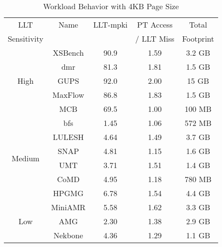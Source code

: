 \begin {table}[b]
\small
\begin{center} 
\vspace{-0.0 in}
\caption{Workload Behavior with 4KB Page Size}
\vspace{-0. in}
\begin{tabular}{| c | c | c | c | c | }
\hline
  LLT                   & Name     &  LLT-mpki  & PT Access    &  Total  \\ 
  Sensitivity           &          &            & / LLT Miss   &  Footprint       \\ \hline
\multirow{5}{*}{High}   & XSBench  & 90.9       & 1.59         &  3.2 GB  \\
                        & dmr      & 81.3       & 1.81         &  1.5 GB  \\
                        & GUPS     & 92.0       & 2.00         &  15  GB  \\
                        & MaxFlow  & 86.8       & 1.83         &  1.5 GB  \\
                        & MCB      & 69.5       & 1.00         &  100 MB  \\ \hline
\multirow{6}{*}{Medium} & bfs      & 1.45       & 1.06         &  572 MB  \\
                        & LULESH   & 4.64       & 1.49         &  3.7  GB \\
                        & SNAP     & 4.81       & 1.15         &  1.6 GB  \\
                        & UMT      & 3.71       & 1.51         &  1.4 GB  \\
                        & CoMD     & 4.95       & 1.18         &  780 MB  \\
                        & HPGMG    & 6.78       & 1.54         &  4.4 GB  \\ \hline 
\multirow{3}{*}{Low}    & MiniAMR  & 5.58       & 1.62         &  3.3 GB  \\
                        & AMG      & 2.30       & 1.38         &  2.9 GB  \\ 
                        & Nekbone  & 4.36       & 1.29         &  1.1 GB  \\ \hline


\end{tabular}
\label{table:bench_char}
\vspace{-0.2in}
\end{center}
\normalsize
\end{table}
